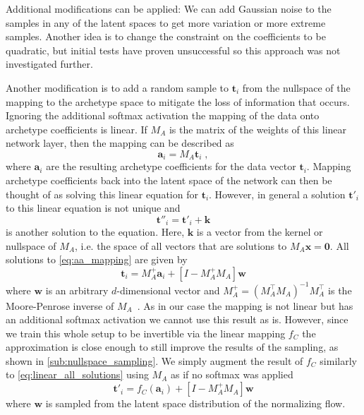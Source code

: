 Additional modifications can be applied: We can add Gaussian noise to the
samples in any of the latent spaces to get more variation or more extreme
samples. Another idea is to change the constraint on the coefficients to be
quadratic, but initial tests have proven unsuccessful so this approach was not
investigated further.

Another modification is to add a random sample to $\mathbf{t}_i$ from the
nullspace of the mapping to the archetype space to mitigate the loss of
information that occurs. Ignoring the additional softmax activation the
mapping of the data onto archetype coefficients is linear. If $M_A$ is the
matrix of the weights of this linear network layer, then the mapping can be
described as
\begin{equation}%
	\label{eq:aa_mapping}
	\mathbf{a}_i = M_A \mathbf{t}_i\;,
\end{equation}
where $\mathbf{a}_i$ are the resulting archetype coefficients for the data vector
$\mathbf{t}_i$. Mapping archetype coefficients back into the latent space of
the network can then be thought of as solving this linear equation for
$\mathbf{t}_i$. However, in general a solution $\mathbf{t}'_i$ to this linear
equation is not unique and
\begin{equation}
	\mathbf{t}''_i = \mathbf{t}'_i + \mathbf{k}
\end{equation}
is another solution to the equation. Here, $\mathbf{k}$ is a vector from the
kernel or nullspace of $M_A$, i.e. the space of all vectors that are solutions to
$M_A \mathbf{x} = \mathbf{0}$. All solutions to \autoref{eq:aa_mapping} are
given by
\begin{equation}%
	\label{eq:linear_all_solutions}
	\mathbf{t}_i = M_A^+ \mathbf{a}_i + [I - M_A^+ M_A] \mathbf{w}
\end{equation}
where $\mathbf{w}$ is an arbitrary $d$-dimensional vector and $M_A^+ =
	(M_A^\top M_A)^{-1} M_A^\top$ is the Moore-Penrose inverse of
$M_A$~\citep{jamesGeneralisedInverse1978}. As in our case the mapping is not
linear but has an additional softmax activation we cannot use this result as
is. However, since we train this whole setup to be invertible via the linear
mapping $f_C$ the approximation is close enough to still improve the results of
the sampling, as shown in \autoref{sub:nullspace_sampling}. We simply augment
the result of $f_C$ similarly to \autoref{eq:linear_all_solutions} using $M_A$
as if no softmax was applied
\begin{equation}%
	\label{eq:augmented_t}
	\mathbf{t}'_i = f_C(\mathbf{a}_i) + [I - M_A^+ M_A] \mathbf{w}
\end{equation}
where $\mathbf{w}$ is sampled from the latent space distribution of the
normalizing flow.

